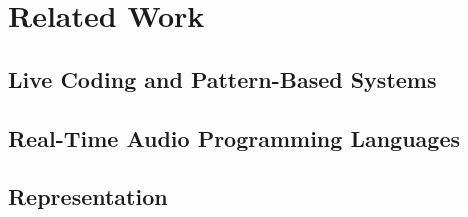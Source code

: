 \chapter{Related Work}\label{ch:related-work}


\section{Live Coding and Pattern-Based Systems}\label{sec:live-coding-and-pattern-based-systems}






\section{Real-Time Audio Programming Languages}\label{sec:real-time-audio-programming-languages}





\section{Representation}\label{sec:representation}


